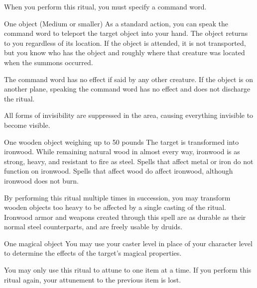 \spellspecial When you perform this ritual, you must specify a command word.
\begin{spelltarget}{One object (Medium or smaller)}
    \spelleffect As a standard action, you can speak the command word to teleport the target object into your hand. The object returns to you regardless of its location. If the object is attended, it is not transported, but you know who has the object and roughly where that creature was located when the summons occurred.
\end{spelltarget}
\spellnotes The command word has no effect if said by any other creature. If the object is on another plane, speaking the command word has no effect and does not discharge the ritual.

\spelldur{\durlong \dismissable}
\spellline
\spelleffect All forms of invisibility are suppressed in the area, causing everything invisible to become visible.

\begin{spelltarget}{One wooden object weighing up to 50 pounds}
    \spelleffect The target is transformed into ironwood. While remaining natural wood in almost every way, ironwood is as strong, heavy, and resistant to fire as steel. Spells that affect metal or iron do not function on ironwood. Spells that affect wood do affect ironwood, although ironwood does not burn.
\end{spelltarget}
\spellnotes By performing this ritual multiple times in succession, you may transform wooden objects too heavy to be affected by a single casting of the ritual. Ironwood armor and weapons created through this spell are as durable as their normal steel counterparts, and are freely usable by druids.

\begin{spelltarget}{One magical object}
    \spelleffect You may use your caster level in place of your character level to determine the effects of the target's magical properties.
\end{spelltarget}
\spellnotes You may only use this ritual to attune to one item at a time. If you perform this ritual again, your attunement to the previous item is lost.

